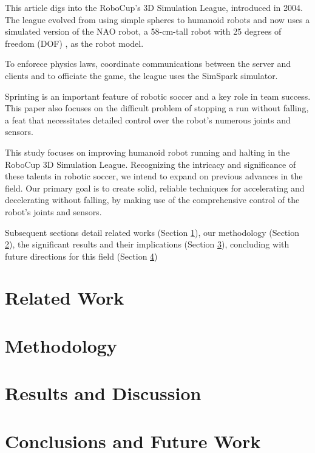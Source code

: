 \documentclass[conference]{IEEEtran}
\begin{document}
This article digs into the RoboCup's 3D Simulation League, introduced in 2004. The league evolved from using simple spheres to humanoid robots and
now uses a simulated version of the NAO robot, a 58-cm-tall robot with 25 degrees of freedom (DOF) \cite{naorobot}, as the robot model.

To enforece physics laws, coordinate communications between the server and clients and to officiate the game, the league uses the SimSpark simulator.

Sprinting is an important feature of robotic soccer and a key role in team success. This paper also focuses on the difficult
problem of stopping a run without falling, a feat that necessitates detailed control over the robot's numerous joints and sensors.

This study focuses on improving humanoid robot running and halting in the RoboCup 3D Simulation League.
Recognizing the intricacy and significance of these talents in robotic soccer, we intend to expand on previous advances in the field.
Our primary goal is to create solid, reliable techniques for accelerating and decelerating without falling, by making use of the comprehensive control
of the robot's joints and sensors.

Subsequent sections detail related works (Section \ref{Related Work}), our methodology (Section \ref{Methodology}),
the significant results and their implications (Section \ref{Results and Discussion}),
concluding with future directions for this field (Section \ref{Conclusions and Future Work})

\section{Related Work}\label{Related Work}


\section{Methodology}\label{Methodology}

\section{Results and Discussion}\label{Results and Discussion}

\section{Conclusions and Future Work}\label{Conclusions and Future Work}
\end{document}
